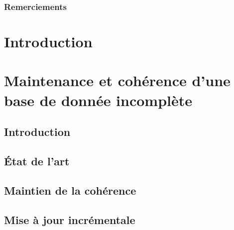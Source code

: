 
\pagestyle{fancy}


\frontmatter
\section*{Remerciements}
\lipsum[17-19]

\newpage

\dominitoc
\tableofcontents
{}
\listoffigures
{}
\listoftables

\mainmatter

\part{Introduction}



\part{Maintenance et cohérence d'une base de donnée incomplète}

\chapter{Introduction}


\chapter{État de l'art}
\minitoc


\chapter{Maintien de la cohérence}
\minitoc


\chapter{Mise à jour incrémentale}
\minitoc


